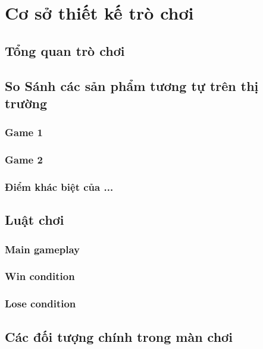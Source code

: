 \section{Cơ sở thiết kế trò chơi}
\subsection{Tổng quan trò chơi}

\subsection{So Sánh các sản phẩm tương tự trên thị trường}
\subsubsection{Game 1}
\subsubsection{Game 2}
\subsubsection{Điểm khác biệt của ...}

\subsection{Luật chơi}
\subsubsection{Main gameplay}
\subsubsection{Win condition}
\subsubsection{Lose condition}

\subsection{Các đối tượng chính trong màn chơi}
